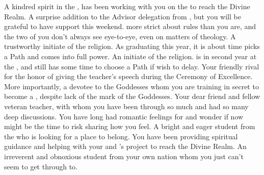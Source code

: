 \documentclass[char]{GL2020}
\begin{document}
\begin{contacts}
    \contact{\cCurse{}} A kindred spirit in the \pFarm{}, \cCurse{} has been working with you on the \iBeansMB{} to reach the Divine Realm.
    \contact{\cEbbPriest{}} A surprise addition to the Advisor delegation from \pShip{}, but you will be grateful to have \cEbbPriest{\their} support this weekend. \cEbbPriest{\Theyare} more strict about rules than you are, and the two of you don't always see eye-to-eye, even on matters of theology.
    \contact{\cInitiate{}} A trustworthy initiate of the \pShippies{} religion. As \cInitiate{\theyare} graduating this year, it is about time \cInitiate{} picks a Path and comes into \cInitiate{\their} full power.
    \contact{\cWarlordDaughter{}} An initiate of the \pShippies{} religion. \cWarlordDaughter{} is in \cWarlordDaughter{\their} second year at the \pSc{}, and still has some time to choose a Path if \cWarlordDaughter{\they} wish\cWarlordDaughter{\verbes} to delay.
    \contact{\cPirate{}} Your friendly rival for the honor of giving the teacher's speech during the Ceremony of Excellence. More importantly, a devotee to the \pShip{} Goddesses whom you are training in secret to become a \cPirate{\cleric}, despite \cPirate{\their} lack of the mark of the Goddesses.
    \contact{\cMusic{}} Your dear friend and fellow veteran teacher, with whom you have been through so much and had so many deep discussions. You have long had romantic feelings for \cMusic{\them} and wonder if now might be the time to risk sharing how you feel.
    \contact{\cAmbition{}} A bright and eager student from the \pTech{} who is looking for a place to belong. You have been providing spiritual guidance and \cAmbition{\theyare} helping with your and \cCurse{}’s project to reach the Divine Realm. 
    \contact{\cPirateChild{}} An irreverent and obnoxious student from your own nation whom you just can’t seem to get through to.
\end{contacts}
\end{document}
